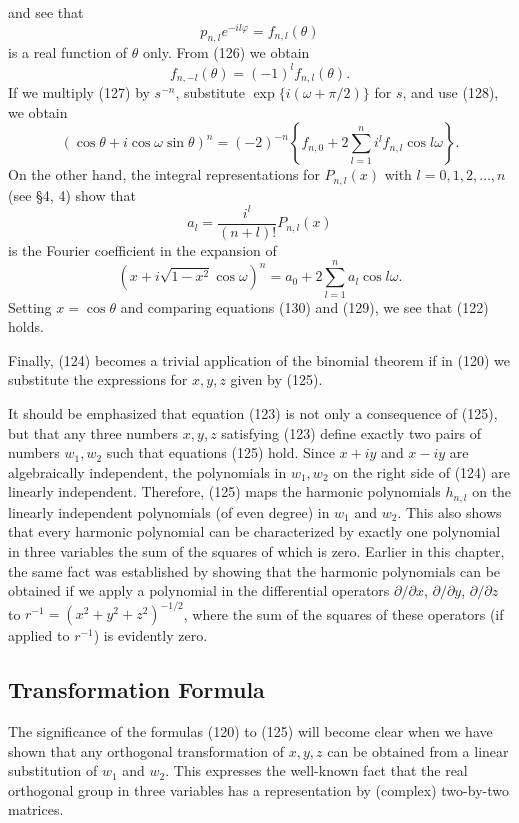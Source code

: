 and see that
\[
p_{n,l}e^{-il\varphi}=f_{n,l}(\theta)
\]
is a real function of $\theta$ only. From (126) we obtain
\begin{equation}\tag{128}
f_{n,-l}(\theta)=(-1)^lf_{n,l}(\theta).
\end{equation}
If we multiply (127) by $s^{-n}$, substitute $\exp\{i(\omega+\pi/2)\}$ for $s$, and use (128), we obtain
\begin{equation}\tag{129}
(\cos\theta+i\cos\omega\sin\theta)^n
=(-2)^{-n}\left\{f_{n,0}+2\sum_{l=1}^n i^lf_{n,l}\cos l\omega\right\}.
\end{equation}
On the other hand, the integral representations for $P_{n,l}(x)$ with $l=0,1,2,\ldots,n$ (see \S4, 4) show that
\[
a_l=\frac{i^l}{(n+l)!}P_{n,l}(x)
\]
is the Fourier coefficient in the expansion of
\begin{equation}\tag{130}
(x+i\sqrt{1-x^2}\cos\omega)^n=a_0+2\sum_{l=1}^na_l\cos l\omega.
\end{equation}
Setting $x=\cos\theta$ and comparing equations (130) and (129), we see that (122) holds.

Finally, (124) becomes a trivial application of the binomial theorem if in (120) we substitute the expressions for $x,y,z$ given by (125).

It should be emphasized that equation (123) is not only a consequence of (125), but that any three numbers $x,y,z$ satisfying (123) define exactly two pairs of numbers $w_1,w_2$ such that equations (125) hold. Since $x+iy$ and $x-iy$ are algebraically independent, the polynomials in $w_1,w_2$ on the right side of (124) are linearly independent. Therefore, (125) maps the harmonic polynomials $h_{n,l}$ on the linearly independent polynomials (of even degree) in $w_1$ and $w_2$. This also shows that every harmonic polynomial can be characterized by exactly one polynomial in three variables the sum of the squares of which is zero. Earlier in this chapter, the same fact was established by showing that the harmonic polynomials can be obtained if we apply a polynomial in the differential operators $\partial/\partial x$, $\partial/\partial y$, $\partial/\partial z$ to $r^{-1}=(x^2+y^2+z^2)^{-1/2}$, where the sum of the squares of these operators (if applied to $r^{-1}$) is evidently zero.

\subsection{Transformation Formula}
The significance of the formulas (120) to (125) will become clear when we have shown that any orthogonal transformation of $x,y,z$ can be obtained from a linear substitution of $w_1$ and $w_2$. This expresses the well-known fact that the real orthogonal group in three variables has a representation by (complex) two-by-two matrices.

